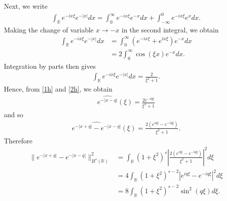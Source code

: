 \documentclass[12pt,reqno]{amsart}
\numberwithin{equation}{section}  %
\numberwithin{figure}{section}
\newcommand{\rr}{\mathbb{R}}
\theoremstyle{plain}  %
\theoremstyle{definition}
\begin{document}
%
%
Next, we write
%
%
\begin{equation*}
  \begin{split}
    \int_{\rr}e^{-ix \xi} e^{-| x |}dx = \int_{0}^{\infty}e^{-ix \xi}
    e^{-x} dx + \int_{-\infty}^{0}e^{-ix \xi} e^{x} dx.
  \end{split}
\end{equation*}
%
%
Making the change of variable $x \to -x$ in the second integral, we obtain
%
%
\begin{equation*}
  \begin{split}
    \int_{\rr}e^{-ix \xi} e^{-| x |}dx
    & = \int_{0}^{\infty} \left( e^{-ix \xi} + e^{ix \xi} \right)e^{-x} dx
    \\
    & = 2 \int_{0}^{\infty} \cos(\xi x)e^{-x}dx.
  \end{split}
\end{equation*}
%
%
Integration by parts then gives
%
%
\begin{equation}
  \label{2h}
  \begin{split}
    \int_{\rr}e^{-ix \xi} e^{-| x |}dx = \frac{2}{\xi^2 + 1}.
  \end{split}
\end{equation}
%
%
Hence, from \eqref{1h} and \eqref{2h}, we obtain
%
%
\begin{equation*}
  \begin{split}
    \widehat{e^{-| x-q |}} (\xi) = \frac{2 e^{-iq \xi}}{ \xi^2 + 1}
  \end{split}
\end{equation*}
%
%
and so
%
%
\begin{equation*}
  \begin{split}
    \widehat{e^{-| x + q |} - e^{-| x-q |}} (\xi) = \frac{2 \left( e^{i q \xi} -
    e^{-i q \xi}
    \right)}{ \xi^2 + 1}.
  \end{split}
\end{equation*}
%
%
Therefore
%
%
\begin{equation*}
  \begin{split}
    \|e^{-| x+q |} - e^{-| x-q |} \|^2_{H^s(\rr)}
    & = \int_{\rr} \left( 1 + \xi^2 \right)^s  \left |
    \frac{2\left( e^{i q \xi} - e^{-i q \xi} \right)}{\xi^2 + 1} \right |^2 d
    \xi
    \\
    & = 4 \int_{\rr}\left( 1 + \xi^2 \right)^{s-2} |e^{i q \xi} - e^{-i q \xi}|^2
    d \xi
    \\
    & = 8 \int_{\rr} \left( 1 + \xi^2 \right)^{s-2} \sin^2(q \xi) d \xi.
  \end{split}
\end{equation*}
\end{document}
